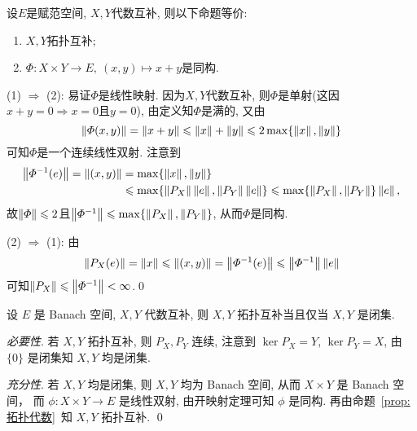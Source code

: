     \begin{Proposition}\label{prop:拓扑代数}
    设$ E $是赋范空间, $ X, Y $代数互补, 则以下命题等价:
    \begin{enumerate}[(1)]
    \item $ X, Y $拓扑互补;
    \item $ \varPhi : X\times Y\to E,\ (x,y)\mapsto x+y $是同构.
    \end{enumerate}
    \end{Proposition}
    \begin{Proof}
    (1) $ \Rightarrow $ (2): 易证$ \varPhi $是线性映射. 因为$ X, Y $代数互补, 则$ \varPhi $是单射(这因$ x+y=0\Longrightarrow x=0 $且$ y=0 $), 由定义知$ \varPhi $是满的, 又由
    \[
    \left\| \varPhi(x,y) \right\|=\left\| x+y \right\|\leqslant\left\| x \right\|+\left\| y \right\|\leqslant 2\max\{ \left\| x \right\|,\left\| y \right\| \}
    \]
    可知$ \varPhi $是一个连续线性双射. 注意到
    \[
    \begin{aligned}
    \left\| \varPhi^{-1}(e) \right\|=\left\| (x,y) \right\|&=\max\{ \left\| x \right\|,\left\| y \right\| \}\\
    &\leqslant\max\{ \left\| P_X \right\|\left\| e \right\|, \left\| P_Y \right\|\left\| e \right\| \}\leqslant\max\{ \left\| P_X \right\|,\left\| P_Y \right\| \}\left\| e \right\|,
    \end{aligned}
    \]
    故$ \left\| \varPhi \right\|\leqslant 2 $且$ \left\| \varPhi^{-1} \right\|\leqslant\max\{ \left\| P_X \right\|,\left\| P_Y \right\| \} $, 从而$ \varPhi $是同构.
    
    (2) $ \Rightarrow $ (1): 由
    \[
    \left\| P_X(e) \right\|=\left\| x \right\|\leqslant\left\| (x,y) \right\|=\left\| \varPhi^{-1}(e) \right\|\leqslant\left\| \varPhi^{-1} \right\|\left\| e \right\|
    \]
    可知$ \left\| P_X \right\|\leqslant\left\| \varPhi^{-1} \right\|<\infty $.\qed
    \end{Proof}
    \begin{Corollary}\label{cor:代数互补成为拓扑互补的条件}
        设 $ E $ 是 Banach 空间,  $ X, Y $ 代数互补, 则 $ X, Y $ 拓扑互补当且仅当 $ X, Y $ 是闭集. 
    \end{Corollary}
    \begin{Proof}
        \textsl{必要性}. 若 $ X, Y $ 拓扑互补, 则 $ P_{X}, P_{Y} $ 连续, 注意到 $ \ker P_{X} = Y $,  $ \ker P_{Y}=X $, 由 $ \{0\} $ 是闭集知 $ X, Y $ 均是闭集. 

        \textsl{充分性}.  若 $ X, Y $ 均是闭集, 则 $ X, Y $ 均为 Banach 空间, 从而 $ X\times Y $ 是 Banach 空间， 而 $ \phi : X\times Y\to E $ 是线性双射, 由开映射定理可知 $ \phi $ 是同构. 再由命题~\ref{prop:拓扑代数}~知 $ X, Y $ 拓扑互补. \qed
    \end{Proof}

